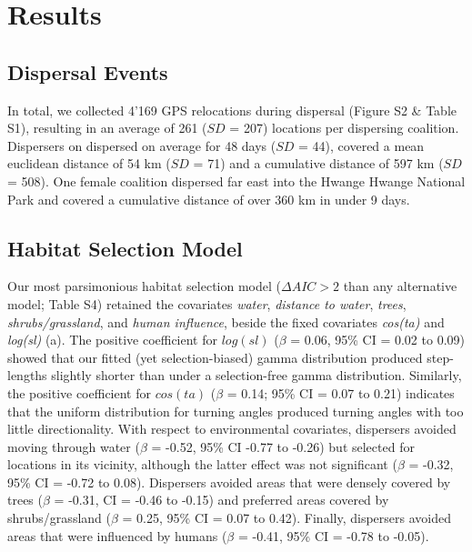\documentclass[abstract=on,10pt,a4paper,bibliography=totocnumbered]{article}
\begin{document}
\section{Results}
\subsection{Dispersal Events}
In total, we collected 4'169 GPS relocations during dispersal (Figure S2 \&
Table S1), resulting in an average of 261 (\(SD\) = 207) locations per
dispersing coalition. Dispersers on dispersed on average for 48 days (\(SD\) =
44), covered a mean euclidean distance of 54 km (\(SD\) = 71) and a cumulative
distance of 597 km (\(SD\) = 508). One female coalition dispersed far east into
the Hwange Hwange National Park and covered a cumulative distance of over 360 km
in under 9 days.

\subsection{Habitat Selection Model}
Our most parsimonious habitat selection model (\(\Delta AIC > 2\) than any
alternative model; Table S4) retained the covariates \textit{water},
\textit{distance to water}, \textit{trees}, \textit{shrubs/grassland}, and
\textit{human influence}, beside the fixed covariates \textit{cos(ta)} and
\textit{log(sl)} (a). The positive coefficient for
\(log(sl)\) (\(\beta\) = 0.06, 95\% CI = 0.02 to 0.09) showed that our fitted
(yet selection-biased) gamma distribution produced step-lengths slightly shorter
than under a selection-free gamma distribution. Similarly, the positive
coefficient for \(cos(ta)\) (\(\beta\) = 0.14; 95\% CI = 0.07 to 0.21) indicates
that the uniform distribution for turning angles produced turning angles with
too little directionality. With respect to environmental covariates, dispersers avoided
moving through water (\(\beta\) = -0.52, 95\% CI -0.77 to -0.26) but selected
for locations in its vicinity, although the latter effect was not significant
(\(\beta\) = -0.32, 95\% CI = -0.72 to 0.08). Dispersers avoided areas that were
densely covered by trees (\(\beta\) = -0.31, CI = -0.46 to -0.15) and preferred
areas covered by shrubs/grassland (\(\beta\) = 0.25, 95\% CI = 0.07 to 0.42).
Finally, dispersers avoided areas that were influenced by humans (\(\beta\) =
-0.41, 95\% CI = -0.78 to -0.05).
\end{document}

